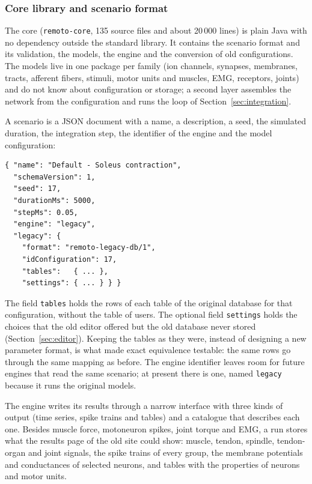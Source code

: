 \documentclass[pdflatex,sn-apa,iicol]{sn-jnl}
\providecommand{\code}[1]{\texttt{#1}}
\begin{document}
\subsubsection{Core library and scenario format}\label{sec:core}

The core (\code{remoto-core}, 135 source files and about 20\,000 lines) is plain Java with no dependency outside the standard library. It contains the scenario format and its validation, the models, the engine and the conversion of old configurations. The models live in one package per family (ion channels, synapses, membranes, tracts, afferent fibers, stimuli, motor units and muscles, EMG, receptors, joints) and do not know about configuration or storage; a second layer assembles the network from the configuration and runs the loop of Section~\ref{sec:integration}.

A scenario is a JSON document with a name, a description, a seed, the simulated duration, the integration step, the identifier of the engine and the model configuration:

\begingroup\footnotesize
\begin{verbatim}
{ "name": "Default - Soleus contraction",
  "schemaVersion": 1,
  "seed": 17,
  "durationMs": 5000,
  "stepMs": 0.05,
  "engine": "legacy",
  "legacy": {
    "format": "remoto-legacy-db/1",
    "idConfiguration": 17,
    "tables":   { ... },
    "settings": { ... } } }
\end{verbatim}
\endgroup

\noindent The field \code{tables} holds the rows of each table of the original database for that configuration, without the table of users. The optional field \code{settings} holds the choices that the old editor offered but the old database never stored (Section~\ref{sec:editor}). Keeping the tables as they were, instead of designing a new parameter format, is what made exact equivalence testable: the same rows go through the same mapping as before. The engine identifier leaves room for future engines that read the same scenario; at present there is one, named \code{legacy} because it runs the original models.

The engine writes its results through a narrow interface with three kinds of output (time series, spike trains and tables) and a catalogue that describes each one. Besides muscle force, motoneuron spikes, joint torque and EMG, a run stores what the results page of the old site could show: muscle, tendon, spindle, tendon-organ and joint signals, the spike trains of every group, the membrane potentials and conductances of selected neurons, and tables with the properties of neurons and motor units.
\end{document}
